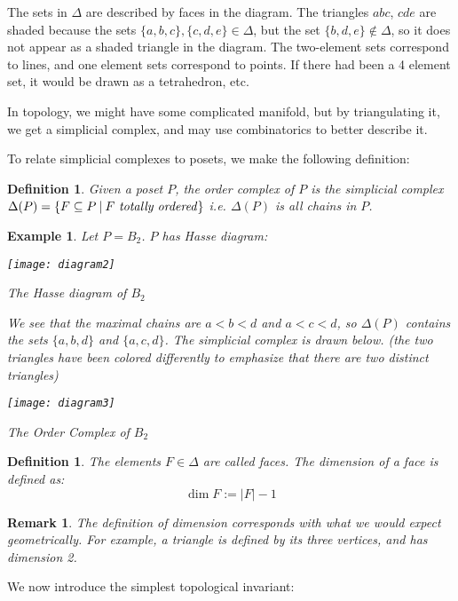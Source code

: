 \documentclass[11pt]{article}
\newtheorem{definition}[theorem]{Definition}
\newtheorem{remark}[theorem]{Remark}
\newtheorem{example}[theorem]{Example}
\begin{document}
The sets in $\Delta$ are described by faces in the diagram. The triangles $abc$, $cde$ are shaded because the sets $\{a,b,c\}, \{c,d,e\}\in \Delta$, but the set $\{b,d,e\}\notin \Delta$, so it does not appear as a shaded triangle in the diagram.  The two-element sets correspond to lines, and one element sets correspond to points. If there had been a 4 element set, it would be drawn as a tetrahedron, etc.

In topology, we might have some complicated manifold, but by triangulating it, we get a simplicial complex, and may use combinatorics to better describe it. 

To relate simplicial complexes to posets, we make the following definition:
\begin{definition}
Given a poset $P$, the \emph{order complex} of $P$ is the simplicial complex $\Delta(P)=\{F\subseteq P \: | \: F\mbox{ \emph{totally ordered}}\}$ i.e. $\Delta(P)$ is all chains in $P$. 
\end{definition}
\begin{example}
Let $P=B_2$. $P$ has Hasse diagram:
\begin{center}
\texttt{[image: diagram2]}

The Hasse diagram of $B_2$
\end{center}

We see that the maximal chains are $a<b<d$ and $a<c<d$, so $\Delta(P)$ contains the sets $\{a,b,d\}$ and $\{a,c,d\}$. The simplicial complex is drawn below. (the two triangles have been colored differently to emphasize that there are two distinct triangles)

\begin{center}
\texttt{[image: diagram3]}

The Order Complex of $B_2$
\end{center}
\end{example}

\begin{definition}
The elements $F\in \Delta$ are called \emph{faces}. The dimension of a face is defined as:
$$\operatorname{dim} F:=|F|-1$$
\end{definition}

\begin{remark}
The definition of dimension corresponds with what we would expect geometrically. For example, a triangle is defined by its three vertices, and has dimension 2.
\end{remark}

We now introduce the simplest topological invariant:
\end{document}
